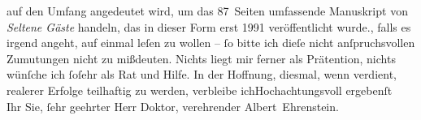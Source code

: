 \begin{ledgroupsized}[t]{13cm}
{{{                  auf den Umfang angedeutet wird, um das 87 Seiten umfassende Manuskript von \emph{Seltene Gäste} handeln, das in dieser Form erst
                     1991 veröffentlicht wurde.}}}\label{K_L01792-2h}, falls es irgend angeht, auf
               einmal leſen zu wollen – ſo bitte ich dieſe nicht anſpruchsvollen Zumutungen nicht zu
               mißdeuten. Nichts liegt mir ferner als Prätention, nichts wünſche ich ſoſehr als Rat
               und Hilfe. In der Hoffnung, diesmal, wenn verdient, realerer Erfolge teilhaftig zu
               werden, verbleibe ich\hspace*{1.5em}Hochachtungsvoll
               ergebenſt{\\}Ihr Sie, ſehr geehrter Herr Doktor, verehrender\pend
           \pstart \spacefill\mbox{Albert Ehrenstein.}\pend{}
         
         \endnumbering{}\end{ledgroupsized}  \newcommand{\dateiname}{L01792}\newcommand{\titel}{Albert Ehrenstein an Arthur Schnitzler, 10. 10. 1908}\newcommand{\editorInnen}{Martin Anton Müller und Gerd-Hermann Susen}
      